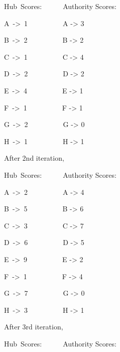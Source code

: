 \documentclass[12pt]{article}
\renewcommand{\_}{\kern-1.5pt\textunderscore\kern-1.5pt}
\begin{document}
Hub\ Scores:\ \ \ \ \ \   Authority Scores:\par

A\ ->\ 1\ \ \ \ \ \ \ \ \ \    A -> 3\par

B\ ->\ 2\ \ \ \ \ \ \ \ \ \    B -> 2\par

C\ ->\ 1\ \ \ \ \ \ \ \ \ \    C -> 4\par

D\ ->\ 2\ \ \ \ \ \ \ \ \ \    D -> 2\par

E\ ->\ 4\ \ \ \ \ \ \ \ \ \    E -> 1\par

F\ ->\ 1\ \ \ \ \ \ \ \ \ \    F -> 1\par

G\ ->\ 2\ \ \ \ \ \ \ \ \ \    G -> 0\par

H\ ->\ 1\ \ \ \ \ \ \ \ \ \    H -> 1\par


\vspace{\baselineskip}After 2nd iteration,\par

Hub\ Scores:\ \ \ \ \ \   Authority Scores:\par

A\ ->\ 2\ \ \ \ \ \ \ \ \ \    A -> 4\par

B\ ->\ 5\ \ \ \ \ \ \ \ \ \    B -> 6\par

C\ ->\ 3\ \ \ \ \ \ \ \ \ \    C -> 7\par

D\ ->\ 6\ \ \ \ \ \ \ \ \ \    D -> 5\par

E\ ->\ 9\ \ \ \ \ \ \ \ \ \    E -> 2\par

F\ ->\ 1\ \ \ \ \ \ \ \ \ \    F -> 4\par

G\ ->\ 7\ \ \ \ \ \ \ \ \ \    G -> 0\par

H\ ->\ 3\ \ \ \ \ \ \ \ \ \    H -> 1\par


\vspace{\baselineskip}After 3rd iteration,\par

Hub\ Scores:\ \ \ \ \ \   Authority Scores:\par
\end{document}
